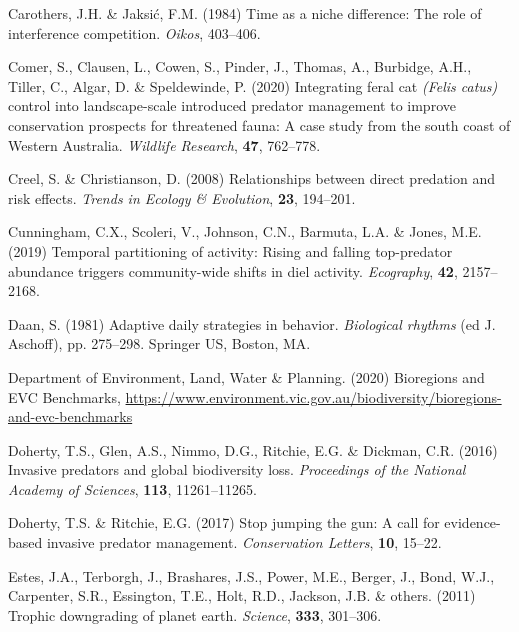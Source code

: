\documentclass[]{elsarticle} %
\begin{document}
\leavevmode\hypertarget{ref-carothers1984time}{}%
Carothers, J.H. \& Jaksić, F.M. (1984) Time as a niche difference: The role of interference competition. \emph{Oikos}, 403--406.

\leavevmode\hypertarget{ref-comer2020integrating}{}%
Comer, S., Clausen, L., Cowen, S., Pinder, J., Thomas, A., Burbidge, A.H., Tiller, C., Algar, D. \& Speldewinde, P. (2020) Integrating feral cat \emph{(Felis catus)} control into landscape-scale introduced predator management to improve conservation prospects for threatened fauna: A case study from the south coast of Western Australia. \emph{Wildlife Research}, \textbf{47}, 762--778.

\leavevmode\hypertarget{ref-creel2008relationships}{}%
Creel, S. \& Christianson, D. (2008) Relationships between direct predation and risk effects. \emph{Trends in Ecology \& Evolution}, \textbf{23}, 194--201.

\leavevmode\hypertarget{ref-cunningham2019temporal}{}%
Cunningham, C.X., Scoleri, V., Johnson, C.N., Barmuta, L.A. \& Jones, M.E. (2019) Temporal partitioning of activity: Rising and falling top-predator abundance triggers community-wide shifts in diel activity. \emph{Ecography}, \textbf{42}, 2157--2168.

\leavevmode\hypertarget{ref-daan1981adaptive}{}%
Daan, S. (1981) Adaptive daily strategies in behavior. \emph{Biological rhythms} (ed J. Aschoff), pp. 275--298. Springer US, Boston, MA.

\leavevmode\hypertarget{ref-delwp2020bioregions}{}%
Department of Environment, Land, Water \& Planning. (2020) Bioregions and EVC Benchmarks, \url{https://www.environment.vic.gov.au/biodiversity/bioregions-and-evc-benchmarks}

\leavevmode\hypertarget{ref-doherty2016invasive}{}%
Doherty, T.S., Glen, A.S., Nimmo, D.G., Ritchie, E.G. \& Dickman, C.R. (2016) Invasive predators and global biodiversity loss. \emph{Proceedings of the National Academy of Sciences}, \textbf{113}, 11261--11265.

\leavevmode\hypertarget{ref-doherty2017stop}{}%
Doherty, T.S. \& Ritchie, E.G. (2017) Stop jumping the gun: A call for evidence-based invasive predator management. \emph{Conservation Letters}, \textbf{10}, 15--22.

\leavevmode\hypertarget{ref-estes2011trophic}{}%
Estes, J.A., Terborgh, J., Brashares, J.S., Power, M.E., Berger, J., Bond, W.J., Carpenter, S.R., Essington, T.E., Holt, R.D., Jackson, J.B. \& others. (2011) Trophic downgrading of planet earth. \emph{Science}, \textbf{333}, 301--306.
\end{document}
